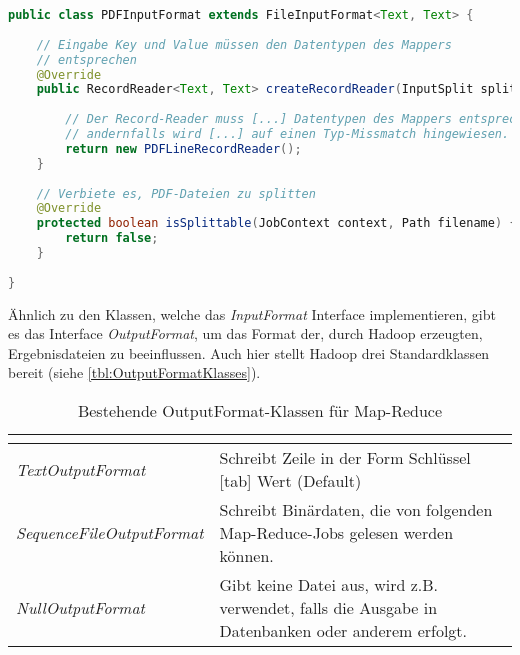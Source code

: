 \begin{lstlisting}[language=Java,caption=Die Klasse PDFInputFormat, title=\autoref*{lst:PDFInputFormat}: Die Klasse PDFInputFormat\protect\footnotemark,label=lst:PDFInputFormat]
public class PDFInputFormat extends FileInputFormat<Text, Text> {
	
	// Eingabe Key und Value müssen den Datentypen des Mappers
	// entsprechen
	@Override
	public RecordReader<Text, Text> createRecordReader(InputSplit split, TaskAttemptContext context) throws IOException, InterruptedException {
	
		// Der Record-Reader muss [...] Datentypen des Mappers entsprechen,
		// andernfalls wird [...] auf einen Typ-Missmatch hingewiesen.
		return new PDFLineRecordReader();
	}
	
	// Verbiete es, PDF-Dateien zu splitten
	@Override
	protected boolean isSplittable(JobContext context, Path filename) {
		return false;
	}
	
}
\end{lstlisting}

Ähnlich zu den Klassen, welche das \textit{InputFormat} Interface implementieren, gibt es das Interface \textit{OutputFormat}, um das Format der, durch Hadoop erzeugten, Ergebnisdateien zu beeinflussen. Auch hier stellt Hadoop drei Standardklassen bereit (siehe \autoref{tbl:OutputFormatKlasses}).

\begin{table}[h]
	\centering
	\begin{tabularx}{\textwidth}{| l | X |}
		\hline
		\rowcolor[HTML]{3531FF} 
		\multicolumn{1}{|l|}{\cellcolor[HTML]{4F88BB}{\color[HTML]{FFFFFF} {\bf Klasse}}} & \multicolumn{1}{l|}{\cellcolor[HTML]{4F88BB}{\color[HTML]{FFFFFF} {\bf Beschreibung}}} \\ \hline
		\textit{TextOutputFormat} & Schreibt Zeile in der Form Schlüssel [tab] Wert (Default) \\  \hline
		\textit{SequenceFileOutputFormat} & Schreibt Binärdaten, die von folgenden Map-Reduce-Jobs gelesen werden können. \\ \hline
		\textit{NullOutputFormat} & Gibt keine Datei aus, wird z.B. verwendet, falls die Ausgabe in Datenbanken oder anderem erfolgt. \\  \hline
	\end{tabularx}
	\caption{Bestehende OutputFormat-Klassen für Map-Reduce\footnotemark}
	\label{tbl:OutputFormatKlasses}
\end{table}

